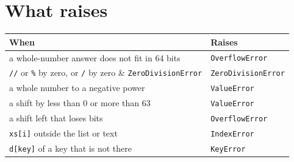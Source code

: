 \section*{What raises}

\begin{center}
\begin{tabular}{ll}
\toprule
When & Raises \\
\midrule
a whole-number answer does not fit in 64 bits & \verb|OverflowError| \\
\verb|//| or \verb|%| by zero, or \verb|/| by zero & \verb|ZeroDivisionError| \\
a whole number to a negative power & \verb|ValueError| \\
a shift by less than 0 or more than 63 & \verb|ValueError| \\
a shift left that loses bits & \verb|OverflowError| \\
\verb|xs[i]| outside the list or text & \verb|IndexError| \\
\verb|d[key]| of a key that is not there & \verb|KeyError| \\
\bottomrule
\end{tabular}
\end{center}
